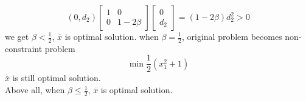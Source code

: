 \documentclass[paper=a4, fontsize=11pt]{scrartcl} %
\numberwithin{equation}{section} %
\numberwithin{figure}{section} %
\numberwithin{table}{section} %
\begin{document}
\begin{equation} \nonumber
(0,d_2)\begin{bmatrix} 1 & 0\\0& 1-2\beta\end{bmatrix}\begin{bmatrix} 0\\d_2\end{bmatrix} = (1-2\beta)d^2_2>0
\end{equation}
we get $\beta<\frac{1}{2}$, $\overline{x}$ is optimal solution. when $\beta=\frac{1}{2}$, original problem becomes non-constraint problem
\begin{equation} \nonumber
\min \frac{1}{2}(x_1^2+1)
\end{equation}
$\overline{x}$ is still optimal solution.\\
Above all, when $\beta\leq\frac{1}{2}$, $\overline{x}$ is optimal solution.
\end{document}
